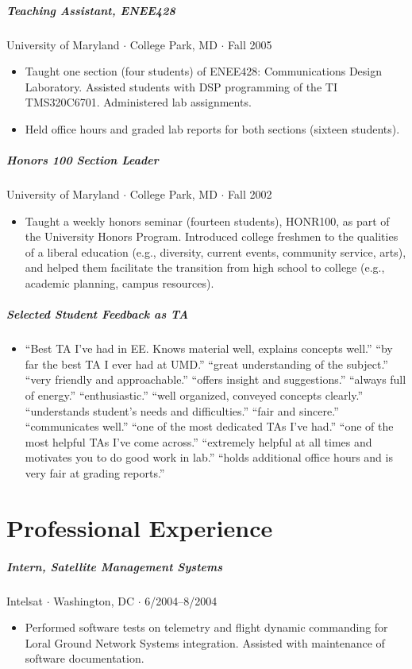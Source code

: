 \documentclass[10pt,letterpaper]{article}
\begin{document}
\subparagraph{Teaching Assistant, ENEE428}
University of Maryland $\cdot$ College Park, MD $\cdot$ Fall 2005
\begin{itemize}
	\item Taught one section (four students) of ENEE428: Communications Design Laboratory. Assisted students with DSP programming of the TI TMS320C6701. Administered lab assignments.
\item Held office hours and graded lab reports for both sections (sixteen students).
\end{itemize}

\subparagraph{Honors 100 Section Leader}
University of Maryland $\cdot$ College Park, MD $\cdot$ Fall 2002
\begin{itemize}
	\item Taught a weekly honors seminar (fourteen students), HONR100, as part of the University Honors Program. Introduced college freshmen to the qualities of a liberal education (e.g., diversity, current events, community service, arts), and helped them facilitate the transition from high school to college (e.g., academic planning, campus resources).
\end{itemize}

\subparagraph{Selected Student Feedback as TA}
\begin{itemize}
	\item ``Best TA I've had in EE. Knows material well, explains concepts well.'' ``by far the best TA I ever had at UMD.''  ``great understanding of the subject.'' ``very friendly and approachable.'' ``offers insight and suggestions.'' ``always full of energy.''  ``enthusiastic.'' ``well organized, conveyed concepts clearly.'' ``understands student's needs and difficulties.'' ``fair and sincere.'' ``communicates well.'' ``one of the most dedicated TAs I've had.'' ``one of the most helpful TAs I've come across.'' ``extremely helpful at all times and motivates you to do good work in lab.'' ``holds additional office hours and is very fair at grading reports.''
\end{itemize}

\section*{Professional Experience}

\subparagraph{Intern, Satellite Management Systems}
Intelsat $\cdot$ Washington, DC $\cdot$ 6/2004--8/2004
\begin{itemize}
\item Performed software tests on telemetry and flight dynamic commanding for Loral Ground Network Systems integration. Assisted with maintenance of software documentation.
\end{itemize}
\end{document}
